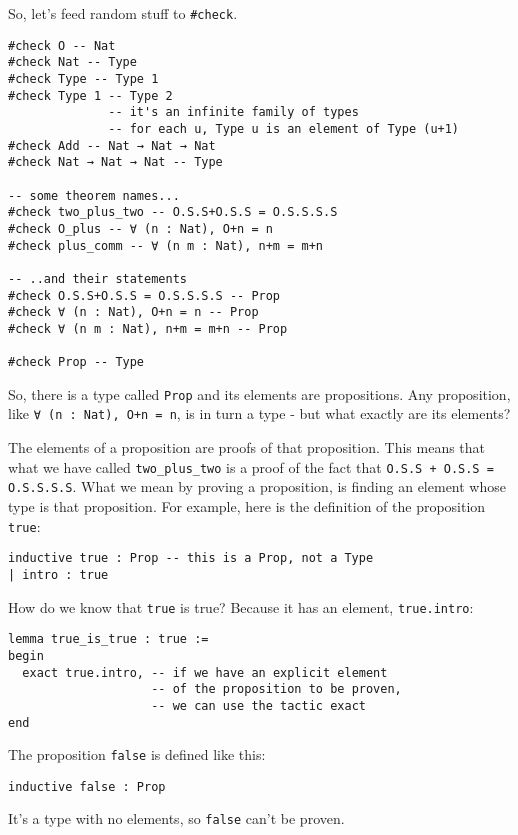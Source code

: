 \documentclass{book}
\theoremstyle{definition}
\theoremstyle{remark}
\theoremstyle{plain}
\begin{document}
So, let's feed random stuff to \lstinline{#check}.
\begin{lstlisting}
#check O -- Nat
#check Nat -- Type
#check Type -- Type 1
#check Type 1 -- Type 2
              -- it's an infinite family of types
              -- for each u, Type u is an element of Type (u+1)
#check Add -- Nat → Nat → Nat
#check Nat → Nat → Nat -- Type

-- some theorem names...
#check two_plus_two -- O.S.S+O.S.S = O.S.S.S.S
#check O_plus -- ∀ (n : Nat), O+n = n
#check plus_comm -- ∀ (n m : Nat), n+m = m+n

-- ..and their statements
#check O.S.S+O.S.S = O.S.S.S.S -- Prop
#check ∀ (n : Nat), O+n = n -- Prop
#check ∀ (n m : Nat), n+m = m+n -- Prop

#check Prop -- Type
\end{lstlisting}
So, there is a type called \lstinline{Prop} and its elements are propositions.
Any proposition, like \lstinline{∀ (n : Nat), O+n = n}, is in turn a type - but what exactly are its elements?

The elements of a proposition are proofs of that proposition.
This means that what we have called \lstinline{two_plus_two} is a proof of the fact that \lstinline{O.S.S + O.S.S = O.S.S.S.S}.
What we mean by proving a proposition, is finding an element whose type is that proposition.
For example, here is the definition of the proposition \lstinline{true}:
\begin{lstlisting}
inductive true : Prop -- this is a Prop, not a Type
| intro : true    
\end{lstlisting}
How do we know that \lstinline{true} is true? Because it has an element, \lstinline{true.intro}:
\begin{lstlisting}
lemma true_is_true : true :=
begin
  exact true.intro, -- if we have an explicit element
                    -- of the proposition to be proven,
                    -- we can use the tactic exact
end
\end{lstlisting}
The proposition \lstinline{false} is defined like this:
\begin{lstlisting}
inductive false : Prop  
\end{lstlisting}
It's a type with no elements, so \lstinline{false} can't be proven.
\end{document}
